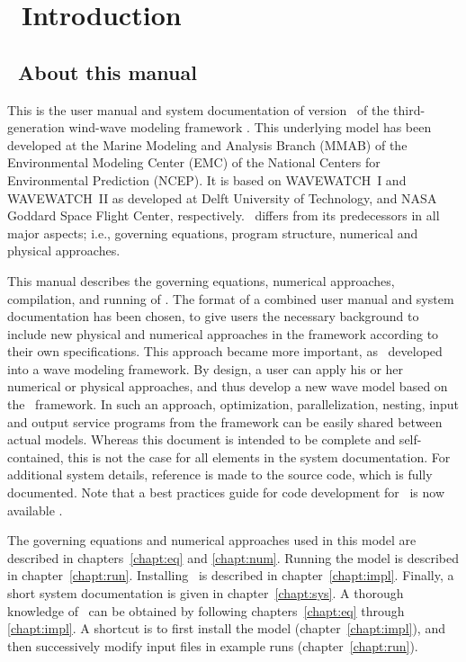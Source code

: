 \section{~Introduction}
\vssub
\subsection{~About this manual}
\vssub

This is the user manual and system documentation of version \WWver\ of the
 third-generation wind-wave modeling framework \ww. This underlying model has
 been developed at the Marine Modeling and Analysis Branch (MMAB) of the
 Environmental Modeling Center (EMC) of the National Centers for Environmental
 Prediction (NCEP). It is based on WAVEWATCH~I and WAVEWATCH~II as developed
 at Delft University of Technology, and NASA Goddard Space Flight Center,
 respectively. \ws\ differs from its predecessors in all major aspects; i.e.,
 governing equations, program structure, numerical and physical
 approaches. %

This manual describes the governing equations, numerical approaches,
compilation, and running of \ws. The format of a combined user manual and
system documentation has been chosen, to give users the necessary background
to include new physical and numerical approaches in the framework according to
their own specifications.  This approach became more important, as \ws\
developed into a wave modeling framework. By design, a user can apply his or
her numerical or physical approaches, and thus develop a new wave model based
on the \ws\ framework. In such an approach, optimization, parallelization,
nesting, input and output service programs from the framework can be easily
shared between actual models.  Whereas this document is intended to be
complete and self-contained, this is not the case for all elements in the
system documentation. For additional system details, reference is made to the
source code, which is fully documented. Note that a best practices guide for
code development for \ws\ is now available \citep{tol:MMAB09b}.

The governing equations and numerical approaches used in this model are
described in chapters~\ref{chapt:eq} and \ref{chapt:num}. Running the model is
described in chapter~\ref{chapt:run}. Installing \ws\ is described in
chapter~\ref{chapt:impl}. Finally, a short system documentation is given in
chapter~\ref{chapt:sys}. A thorough knowledge of \ws\ can be obtained by
following chapters~\ref{chapt:eq} through \ref{chapt:impl}. A shortcut is to
first install the model (chapter~\ref{chapt:impl}), and then successively
modify input files in example runs (chapter~\ref{chapt:run}).

